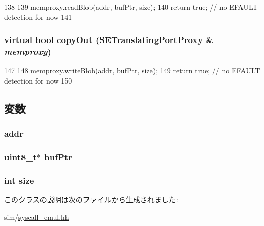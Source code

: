 \begin{DoxyCode}
138     {
139         memproxy.readBlob(addr, bufPtr, size);
140         return true;    // no EFAULT detection for now
141     }
\end{DoxyCode}
\hypertarget{classBaseBufferArg_ac23dfde74cedabe689c1380678b66622}{
\subsubsection[{copyOut}]{\setlength{\rightskip}{0pt plus 5cm}virtual bool copyOut ({\bf SETranslatingPortProxy} \& {\em memproxy})}}
\label{classBaseBufferArg_ac23dfde74cedabe689c1380678b66622}



\begin{DoxyCode}
147     {
148         memproxy.writeBlob(addr, bufPtr, size);
149         return true;    // no EFAULT detection for now
150     }
\end{DoxyCode}


\subsection{変数}
\hypertarget{classBaseBufferArg_a0bb77b4ba61e408313e1118250f9278c}{
\subsubsection[{addr}]{ {\bf addr}}}
\label{classBaseBufferArg_a0bb77b4ba61e408313e1118250f9278c}
\hypertarget{classBaseBufferArg_a2c8fa4078c67cc4cdb4c1819c127e42f}{
\subsubsection[{bufPtr}]{\setlength{\rightskip}{0pt plus 5cm}uint8\_\-t$\ast$ {\bf bufPtr}}}
\label{classBaseBufferArg_a2c8fa4078c67cc4cdb4c1819c127e42f}
\hypertarget{classBaseBufferArg_a439227feff9d7f55384e8780cfc2eb82}{
\subsubsection[{size}]{\setlength{\rightskip}{0pt plus 5cm}int {\bf size}}}
\label{classBaseBufferArg_a439227feff9d7f55384e8780cfc2eb82}


このクラスの説明は次のファイルから生成されました:\begin{DoxyCompactItemize}
\item 
sim/\hyperlink{syscall__emul_8hh}{syscall\_\-emul.hh}\end{DoxyCompactItemize}
